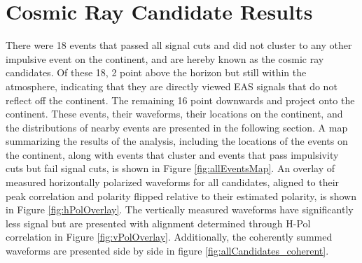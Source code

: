 		
		

\section{Cosmic Ray Candidate Results}
	There were 18 events that passed all signal cuts and did not cluster to any other impulsive event on the continent, and are hereby known as the cosmic ray candidates.  Of these 18, 2 point above the horizon but still within the atmosphere, indicating that they are directly viewed EAS signals that do not reflect off the continent.  The remaining 16 point downwards and project onto the continent.  These events, their waveforms, their locations on the continent, and the distributions of nearby events  are presented in the following section.  A map summarizing the results of the analysis, including the locations of the events on the continent, along with events that cluster and events that pass impulsivity cuts but fail signal cuts, is shown in Figure \ref{fig:allEventsMap}. An overlay of measured horizontally polarized waveforms for all candidates, aligned to their peak correlation and polarity flipped relative to their estimated polarity, is shown in Figure \ref{fig:hPolOverlay}.  The vertically measured waveforms have significantly less signal but are presented with alignment determined through H-Pol correlation in Figure \ref{fig:vPolOverlay}.  Additionally, the coherently summed waveforms are presented side by side in figure \ref{fig:allCandidates_coherent}.
	
